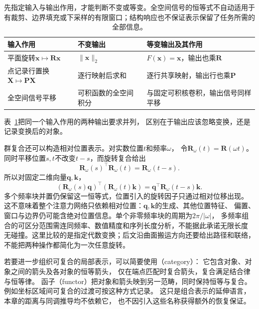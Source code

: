 \begin{table}[htbp]
 \centering\small
 \begin{tabularx}{\linewidth}{@{}lXX@{}}
 \toprule
 输入作用 & 不变输出 & 等变输出及其作用\\
 \midrule
 平面旋转$\bm x\mapsto\bm R\bm x$
 & $\lVert\bm x\rVert_2$ & $F(\bm x)=\bm x$，输出也乘$\bm R$\\
 点记录行置换$\bm X\mapsto\bm P\bm X$
 & 逐行映射后求和 & 逐行共享映射，输出行也乘$\bm P$\\
 全空间信号平移
 & 可积函数的全空间积分 & 与固定可积核卷积，输出信号同样平移\\
 \bottomrule
 \end{tabularx}
 \caption{先指定输入与输出作用，才能判断不变或等变。全空间信号的恒等式不自动适用于
 有裁剪、边界填充或下采样的有限窗口；结构响应也不保证表示保留了任务所需的全部信息。}
 \label{tab:geometry-invariance-equivariance}
\end{table}
表~\ref{tab:geometry-invariance-equivariance}把同一个输入作用的两种输出要求并列，
区别在于输出应该忽略变换，还是记录变换后的对象。


群复合还可以构造相对位置表示。对实数位置$t$和频率$\omega$，
令$\bm R_\omega(t)=\bm R(\omega t)$。同时平移位置$s,t$不改变$t-s$，而旋转复合给出
\begin{equation}
 \bm R_\omega(s)^\top\bm R_\omega(t)=\bm R_\omega(t-s).
 \label{eq:geometry-rotary-relative-position}
\end{equation}
所以对固定二维向量$\bm q,\bm k$，
\begin{equation}
 (\bm R_\omega(s)\bm q)^\top(\bm R_\omega(t)\bm k)
 =\bm q^\top\bm R_\omega(t-s)\bm k.
 \label{eq:geometry-rotary-dot-product}
\end{equation}
多个频率块并置仍保留这一恒等式，位置引入的旋转因子只通过相对位移出现。
这不意味着整个注意力网络只依赖相对位置：$\bm q,\bm k$的生成、其他位置特征、
偏置、窗口与边界仍可能含绝对位置信息。单个非零频率块的周期为$2\pi/|\omega|$，
多频率组合的可区分范围需连同频率、数值精度和序列长度分析，不能据此承诺无限长度
无碰撞。这里比较的是指定代数变换；后文沿曲面搬运方向还要给出路径和联络，
不能把两种操作都简化为一次任意旋转。


若要进一步组织可复合的局部表示，可以简要使用（category）：
它包含对象、对象之间的箭头及各对象的恒等箭头，
仅在端点匹配时复合箭头，复合满足结合律与恒等律。
函子（functor）把对象和箭头映到另一范畴，同时保持恒等与复合。
例如坐标区域间可复合的过渡可按这种方式记录。
这只是组合表示的延伸语言，本章的距离与同调推导均不依赖它，
也不因引入这些名称获得额外的恢复保证。

